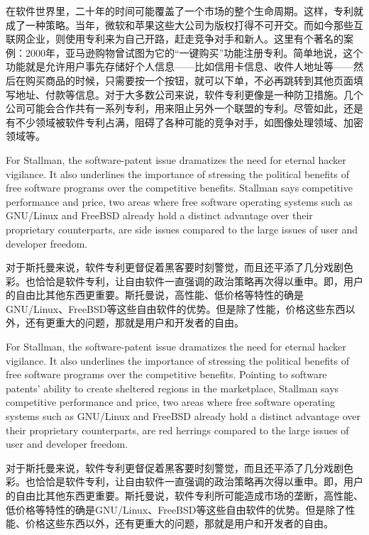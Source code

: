 \ifdefined\chs
在软件世界里，二十年的时间可能覆盖了一个市场的整个生命周期。这样，专利就成了一种策略。当年，微软和苹果这些大公司为版权打得不可开交。而如今那些互联网企业，则使用专利来为自己开路，赶走竞争对手和新人。这里有个著名的案例：2000年，亚马逊购物曾试图为它的``一键购买''功能注册专利。简单地说，这个功能就是允许用户事先存储好个人信息——比如信用卡信息、收件人地址等——然后在购买商品的时候，只需要按一个按钮，就可以下单，不必再跳转到其他页面填写地址、付款等信息。对于大多数公司来说，软件专利更像是一种防卫措施。几个公司可能会合作共有一系列专利，用来阻止另外一个联盟的专利。尽管如此，还是有不少领域被软件专利占满，阻碍了各种可能的竞争对手，如图像处理领域、加密领域等。
\fi
\fi

\ifdefined\vtwo
\ifdefined\eng
For Stallman, the software-patent issue dramatizes the need for eternal hacker vigilance. It also underlines the importance of stressing the political benefits of free software programs over the competitive benefits. Stallman says competitive performance and price, two areas where free software operating systems such as GNU/Linux and FreeBSD already hold a distinct advantage over their proprietary counterparts, are side issues compared to the large issues of user and developer freedom.
\fi

\ifdefined\chs
对于斯托曼来说，软件专利更督促着黑客要时刻警觉，而且还平添了几分戏剧色彩。也恰恰是软件专利，让自由软件一直强调的政治策略再次得以重申。即，用户的自由比其他东西更重要。斯托曼说，高性能、低价格等特性的确是GNU/Linux、FreeBSD等这些自由软件的优势。但是除了性能，价格这些东西以外，还有更重大的问题，那就是用户和开发者的自由。
\fi
\fi

\ifdefined\vone
\ifdefined\eng
For Stallman, the software-patent issue dramatizes the need for eternal hacker vigilance. It also underlines the importance of stressing the political benefits of free software programs over the competitive benefits. Pointing to software patents' ability to create sheltered regions in the marketplace, Stallman says competitive performance and price, two areas where free software operating systems such as GNU/Linux and FreeBSD already hold a distinct advantage over their proprietary counterparts, are red herrings compared to the large issues of user and developer freedom.
\fi

\ifdefined\chs
对于斯托曼来说，软件专利更督促着黑客要时刻警觉，而且还平添了几分戏剧色彩。也恰恰是软件专利，让自由软件一直强调的政治策略再次得以重申。即，用户的自由比其他东西更重要。斯托曼说，软件专利所可能造成市场的垄断，高性能、低价格等特性的确是GNU/Linux、FreeBSD等这些自由软件的优势。但是除了性能、价格这些东西以外，还有更重大的问题，那就是用户和开发者的自由。
\fi
\fi

